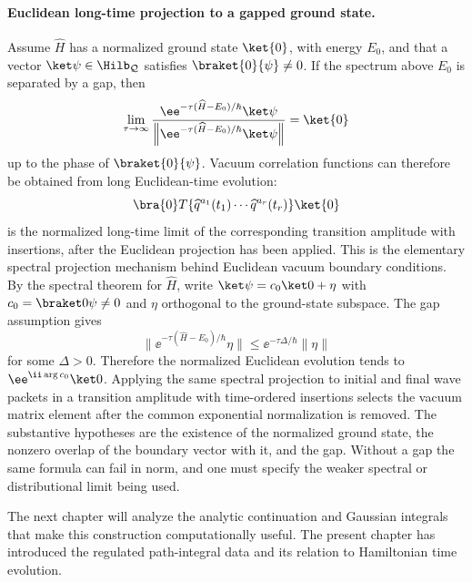 \paragraph{Euclidean long-time projection to a gapped ground state.}
Assume \(\widehat H\) has a normalized ground state \(\ket{0}\), with energy
\(E_0\), and that a vector \(\ket\psi\in\Hilb_{\mathcal Q}\) satisfies
\(\braket{0}{\psi}\ne0\). If the spectrum above \(E_0\) is separated by a
gap, then
\[
  \lim_{\tau\to\infty}
  \frac{\ee^{-\tau(\widehat H-E_0)/\hbar}\ket\psi}
       {\left\|\ee^{-\tau(\widehat H-E_0)/\hbar}\ket\psi\right\|}
  =
  \ket{0}
\]
up to the phase of \(\braket{0}{\psi}\). Vacuum correlation functions can
therefore be obtained from long Euclidean-time evolution:
\[
  \bra{0}T\{\widehat q^{a_1}(t_1)\cdots
  \widehat q^{a_r}(t_r)\}\ket{0}
\]
is the normalized long-time limit of the corresponding transition amplitude
with insertions, after the Euclidean projection has been applied.
This is the elementary spectral projection mechanism behind Euclidean vacuum
boundary conditions.  By the spectral theorem for \(\widehat H\), write
\(\ket\psi=c_0\ket0+\eta\) with \(c_0=\braket0\psi\ne0\) and \(\eta\)
orthogonal to the ground-state subspace.  The gap assumption gives
\[
  \|\ee^{-\tau(\widehat H-E_0)/\hbar}\eta\|
  \le
  \ee^{-\tau\Delta/\hbar}\|\eta\|
\]
for some \(\Delta>0\).  Therefore the normalized Euclidean evolution tends to
\(\ee^{\ii\arg c_0}\ket0\).  Applying the same spectral projection to initial
and final wave packets in a transition amplitude with time-ordered insertions
selects the vacuum matrix element after the common exponential normalization is
removed.
The substantive hypotheses are the existence of the normalized ground state,
the nonzero overlap of the boundary vector with it, and the gap.  Without a
gap the same formula can fail in norm, and one must specify the weaker
spectral or distributional limit being used.

The next chapter will analyze the analytic continuation and Gaussian
integrals that make this construction computationally useful. The present
chapter has introduced the regulated path-integral data and its relation to
Hamiltonian time evolution.
